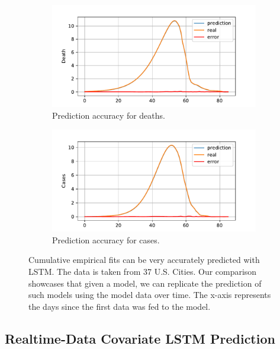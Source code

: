 \documentclass[a4paper, inpress]{jds} %
\renewcommand{\_}{%
    \textunderscore\hspace{0pt}%
}
\begin{document}
\begin{figure}[!h]
    \centering

    \begin{subfigure}{.49\textwidth}
      \centering
      \includegraphics[width=1.0\linewidth]{images/predict/Fig4a.pdf}  
      \caption{Prediction accuracy for deaths.}
      \label{fig:magic-a}
    \end{subfigure}
    \begin{subfigure}{0.49\textwidth}
      \centering
      \includegraphics[width=1.0\linewidth]{images/predict/Fig4b.pdf}        
      \caption{Prediction accuracy for cases.}
      \label{fig:magic-b}
    \end{subfigure}

    \caption{Cumulative empirical fits can be very accurately
      predicted with LSTM. The data is taken from 37 U.S. Cities. Our
      comparison showcases that given a model, we can replicate the
      prediction of such models using the model data over time. The
      x-axis represents the days since the first data was fed to the
      model.}
    \label{fig:magic-1}
\end{figure}




\subsection{Realtime-Data Covariate LSTM Prediction}
\label{sec:lstm-covariate}
\end{document}
